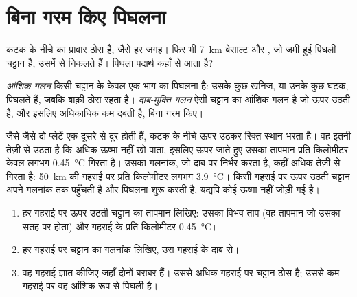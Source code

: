 \section{बिना गरम किए पिघलना}

कटक के नीचे का प्रावार ठोस  है, जैसे हर जगह। फिर भी
\qty{7}{km} बेसाल्ट और , जो जमी हुई पिघली चट्टान है, उसमें से निकलते हैं। पिघला पदार्थ
कहाँ से आता है?

\begin{definition}\label{def:g11:ocean-ridges:partial-melting}
\emph{आंशिक गलन} किसी चट्टान के केवल एक भाग का
पिघलना है: उसके कुछ खनिज, या उनके कुछ घटक, पिघलते हैं, जबकि
बाक़ी ठोस रहता है।
\emph{दाब-मुक्ति गलन} ऐसी चट्टान का आंशिक गलन है जो ऊपर उठती है, और इसलिए अधिकाधिक
कम दबती है, बिना गरम किए।
\end{definition}

जैसे-जैसे दो प्लेटें एक-दूसरे से दूर होती हैं,  कटक के नीचे ऊपर उठकर
रिक्त स्थान भरता है। वह इतनी तेज़ी से उठता है कि अधिक ऊष्मा नहीं खो पाता, इसलिए ऊपर जाते हुए उसका तापमान
प्रति किलोमीटर केवल लगभग \qty{0.45}{\celsius} गिरता है। उसका गलनांक,
जो दाब पर निर्भर करता है, कहीं अधिक तेज़ी से गिरता है: \qty{50}{km} की गहराई पर
प्रति किलोमीटर लगभग \qty{3.9}{\celsius}। किसी गहराई पर
ऊपर उठती चट्टान अपने गलनांक तक पहुँचती है और पिघलना शुरू करती है, यद्यपि
कोई ऊष्मा नहीं जोड़ी गई है।

\begin{method}\label{met:g11:ocean-ridges:melting}
\begin{enumerate}
  \item हर गहराई पर ऊपर उठती चट्टान का तापमान लिखिए: उसका
        विभव ताप (वह तापमान जो उसका सतह पर होता)
        और गहराई के प्रति किलोमीटर \qty{0.45}{\celsius}।
  \item हर गहराई पर चट्टान का गलनांक लिखिए, उस गहराई के
        दाब से।
  \item वह गहराई ज्ञात कीजिए जहाँ दोनों बराबर हैं। उससे अधिक गहराई पर चट्टान ठोस है;
        उससे कम गहराई पर वह आंशिक रूप से पिघली है।
\end{enumerate}
\end{method}

